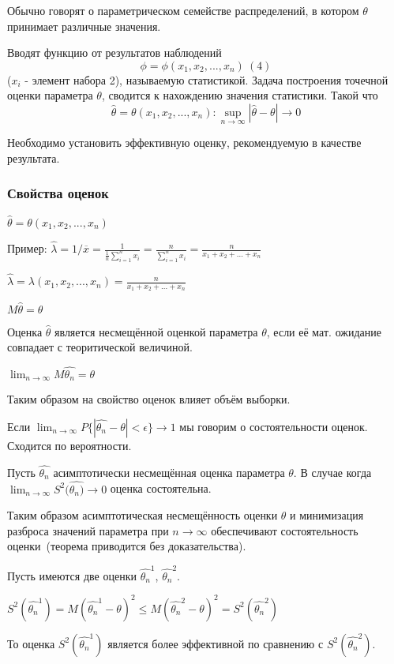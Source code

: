 \documentclass[12pt,a4paper,oneside]{extarticle}
\begin{document}
        Обычно говорят о параметрическом семействе распределений, в котором $\theta$ принимает различные значения.

        Вводят функцию от результатов наблюдений $$\phi=\phi(x_1,x_2,...,x_n) ~(4)$$ ($x_i$ - элемент набора 2), называемую статистикой. Задача построения точечной оценки параметра $\theta$, сводится к нахождению значения статистики. Такой что $$\hat{\theta}=\theta(x_1, x_2, ..., x_n): \sup_{n\rightarrow \infty} |\hat{\theta} - \theta| \rightarrow 0$$

        Необходимо установить эффективную оценку, рекомендуемую в качестве результата.

        \subsubsection{Свойства оценок}
        $\hat{\theta}=\theta(x_1, x_2, ..., x_n)$

        Пример:
        $\hat{\lambda}=1/\overline{x} = \frac{1}{\frac{1}{n} \sum_{i=1}^{n}x_i} = \frac{n}{\sum_{i=1}^{n}x_i} = \frac{n}{x_1+x_2+...+x_n}$

        $\hat{\lambda}=\lambda(x_1, x_2, ..., x_n)=\frac{n}{x_1+x_2+...+x_n}$

        $M\hat{\theta}=\theta$

        Оценка $\hat{\theta}$ является несмещённой оценкой параметра $\theta$, если её мат. ожидание совпадает с теоритической величиной.

        $\lim_{n \rightarrow \infty} M\hat{\theta_n}=\theta$

        Таким образом на свойство оценок влияет объём выборки.

        Если $\lim_{n \rightarrow \infty} P\{|\hat{\theta_n}-\theta| < \epsilon \}\rightarrow 1$ мы говорим о состоятельности оценок. Сходится по вероятности.

        Пусть $\hat{\theta_n}$ асимптотически несмещённая оценка параметра $\theta$. В случае когда $\lim_{n\rightarrow\infty} S^2(\hat{\theta_n)}\rightarrow 0$ оценка состоятельна.

        Таким образом асимптотическая несмещённость оценки $\theta$ и минимизация разброса значений параметра при $n \rightarrow \infty$ обеспечивают состоятельность оценки~(теорема приводится без доказательства).

        Пусть имеются две оценки $\hat{\theta_n}^1$, $\hat{\theta_n}^2$.

        $S^2(\hat{\theta_n}^1)=M(\hat{\theta_n}^1 - \theta)^2 \leq M(\hat{\theta_n}^2 - \theta)^2 = S^2(\hat{\theta_n}^2)$

        То оценка $S^2(\hat{\theta_n}^1)$ является более эффективной по сравнению с $S^2(\hat{\theta_n}^2)$.
\end{document}
